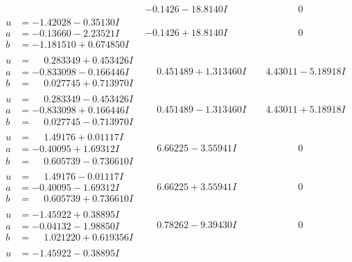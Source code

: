 \documentclass[1p]{elsarticle_modified}
\theoremstyle{definition}
\begin{document}
$$\begin{array}{c|c|c}
 & -0.1426 - 18.8140 I & \phantom{-0.000000 } 0 \\ \hline\begin{aligned}
u &= -1.42028 - 0.35130 I \\
a &= -0.13660 - 2.23521 I \\
b &= -1.181510 + 0.674850 I\end{aligned}
 & -0.1426 + 18.8140 I & \phantom{-0.000000 } 0 \\ \hline\begin{aligned}
u &= \phantom{-}0.283349 + 0.453426 I \\
a &= -0.833098 - 0.166446 I \\
b &= \phantom{-}0.027745 + 0.713970 I\end{aligned}
 & \phantom{-}0.451489 + 1.313460 I & \phantom{-}4.43011 - 5.18918 I \\ \hline\begin{aligned}
u &= \phantom{-}0.283349 - 0.453426 I \\
a &= -0.833098 + 0.166446 I \\
b &= \phantom{-}0.027745 - 0.713970 I\end{aligned}
 & \phantom{-}0.451489 - 1.313460 I & \phantom{-}4.43011 + 5.18918 I \\ \hline\begin{aligned}
u &= \phantom{-}1.49176 + 0.01117 I \\
a &= -0.40095 + 1.69312 I \\
b &= \phantom{-}0.605739 - 0.736610 I\end{aligned}
 & \phantom{-}6.66225 - 3.55941 I & \phantom{-0.000000 } 0 \\ \hline\begin{aligned}
u &= \phantom{-}1.49176 - 0.01117 I \\
a &= -0.40095 - 1.69312 I \\
b &= \phantom{-}0.605739 + 0.736610 I\end{aligned}
 & \phantom{-}6.66225 + 3.55941 I & \phantom{-0.000000 } 0 \\ \hline\begin{aligned}
u &= -1.45922 + 0.38895 I \\
a &= -0.04132 - 1.98850 I \\
b &= \phantom{-}1.021220 + 0.619356 I\end{aligned}
 & \phantom{-}0.78262 - 9.39430 I & \phantom{-0.000000 } 0 \\ \hline\begin{aligned}
u &= -1.45922 - 0.38895 I \\

\end{aligned}
\end{array}$$
\end{document}
